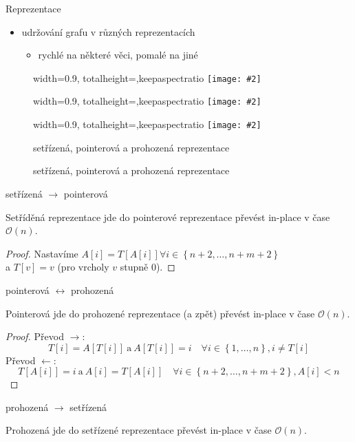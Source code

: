 \documentclass[czech]{beamer}
\makeatletter
\newcommand{\fitimage}[2][\@nil]{
	\begin{figure}
		\begin{adjustbox}{width=0.9\textwidth, totalheight=\textheight-2\baselineskip-2\baselineskip,keepaspectratio}
			\texttt{[image: \#2]}
		\end{adjustbox}
		\def\tmp{#1}%
	 \ifx\tmp\@nnil
			\else
			\caption{#1}
		\fi
	\end{figure}
}
\makeatother
\begin{document}
	\begin{frame}{Reprezentace}
		\begin{itemize}
			\item udržování grafu v různých reprezentacích
			\begin{itemize}
				\item rychlé na některé věci, pomalé na jiné
			\end{itemize}
		\end{itemize}

		\fitimage{images/sorted.png}
		\fitimage{images/pointer.png}
		\fitimage[setřízená, pointerová a prohozená reprezentace]{images/swapped.png}
	\end{frame}

	\begin{frame}{setřízená $\rightarrow$ pointerová}
		\begin{lemma}
			Setříděná reprezentace jde do pointerové reprezentace převést in-place v čase $\mathcal{O}\left(n\right)$.
		\end{lemma}

		\begin{proof}
			Nastavíme $A[i] = T\left[A\left[i\right]\right] \forall i \in \left\{n + 2, \ldots, n + m + 2\right\}$ \\
			a $T\left[v\right] = v$ (pro vrcholy $v$ stupně $0$).
		\end{proof}
	\end{frame}

	\begin{frame}{pointerová $\longleftrightarrow$ prohozená}
		\begin{lemma}
			Pointerová jde do prohozené reprezentace (a zpět) převést in-place v čase $\mathcal{O}\left(n\right)$.
		\end{lemma}

		\begin{proof}
			Převod $\rightarrow$: $$T[i] = A[T[i]]\ \text{a}\ A[T[i]] = i\quad \forall i \in \left\{1, \ldots, n\right\}, i \neq T[i]$$
			Převod $\leftarrow$: $$T[A[i]] = i\ \text{a}\ A[i] = T[A[i]]\quad \forall i \in \left\{n + 2, \ldots, n + m + 2\right\}, A[i] < n$$
		\end{proof}
	\end{frame}

	\begin{frame}{prohozená $\rightarrow$ setřízená}
		\begin{lemma}
			Prohozená jde do setřízené reprezentace převést in-place v čase $\mathcal{O}\left(n\right)$.
		\end{lemma}
	\end{frame}
\end{document}
